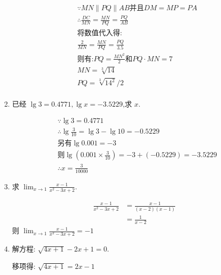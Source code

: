\documentclass[answers]{exam}
\begin{document}
\begin{questions}
\begin{enumerate}[label=(\arabic*)]
		      \begin{solution}
			      \begin{align*}
				       & \because MN \parallel PQ \parallel AB \text{并且} DM = MP = PA \\
				       & \therefore \frac{DC}{MN} = \frac{MN}{PQ} = \frac{PQ}{AB}       \\
				       & \text{将数值代入得:}                                          \\
				       & \frac{2}{MN} = \frac{MN}{PQ} = \frac{PQ}{3.5}                  \\
				       & \text{则有:} PQ = \frac{MN^2}{2} \text{和} PQ \cdot MN = 7    \\
				       & MN = \sqrt[3]{14}                                              \\
				       & PQ = \sqrt[3]{14^2} / 2                                        \\
			      \end{align*}
		      \end{solution}
		\item 已经 \( \lg3=0.4771, \lg{x}=-3.5229 \),求 \( x \).
		      \begin{solution}
			      \begin{align*}
				       & \because \lg3                              = 0.4771                   \\
				       & \therefore \lg{\frac{3}{10}}               = \lg3 - \lg10 = -0.5229   \\
				       & \text{另有} \lg0.001                       = -3                       \\
				       & \text{则} \lg(0.001 \times \frac{3}{10} )  = -3 + (-0.5229) = -3.5229 \\
				       & \therefore x = \frac{3}{10000}
			      \end{align*}
		      \end{solution}
		\item 求 \(\displaystyle \lim_{x\to1}\frac{x-1}{x^2-3x+2} \).
		      \begin{solution}
			      \begin{align*}
				      \frac{x-1}{x^2 - 3x + 2} & = \frac{x-1}{(x-2)(x-1)} \\
				                               & = \frac{1}{x-2}
			      \end{align*}
			      则 \( \displaystyle \lim_{x\to1}\frac{x-1}{x^2-3x+2}=-1 \)
		      \end{solution}
		\item 解方程: \( \sqrt{4x+1} - 2x + 1 = 0 \).
		      \begin{solution}
			      移项得:
			      \begin{math}
				      \sqrt{4x+1} = 2x - 1
			      \end{math}


\end{solution}
\end{enumerate}
\end{questions}
\end{document}
